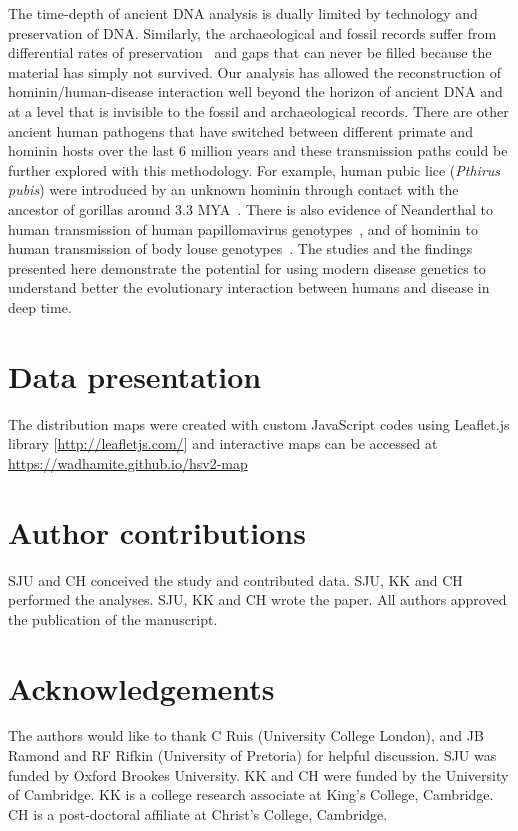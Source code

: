 \documentclass[fleqn,10pt]{wlscirep}
\begin{document}
The time-depth of ancient DNA analysis is dually limited by technology and preservation of DNA. Similarly, the archaeological and fossil records suffer from differential rates of preservation~\citep{Allentoft2012} and gaps that can never be filled because the material has simply not survived. Our analysis has allowed the reconstruction of hominin/human-disease interaction well beyond the horizon of ancient DNA and at a level that is invisible to the fossil and archaeological records. There are other ancient human pathogens that have switched between different primate and hominin hosts over the last 6 million years and these transmission paths could be further explored with this methodology. For example, human pubic lice (\textit{Pthirus pubis}) were introduced by an unknown hominin through contact with the ancestor of gorillas around 3.3 MYA~\citep{Reed2007}. There is also evidence of Neanderthal to human transmission of human papillomavirus genotypes~\citep{Pimenoff2017}, and of hominin to human transmission of body louse genotypes~\citep{Reed2004a}. The studies and the findings presented here demonstrate the potential for using modern disease genetics to understand better the evolutionary interaction between humans and disease in deep time.

\section*{Data presentation}
The distribution maps were created with custom JavaScript codes using Leaflet.js library  [\url{http://leafletjs.com/}] and interactive maps can be accessed at \url{https://wadhamite.github.io/hsv2-map}

\section*{Author contributions}
SJU and CH conceived the study and contributed data. SJU, KK and CH performed the analyses. SJU, KK and CH wrote the paper. All authors approved the publication of the manuscript.

\section*{Acknowledgements}
The authors would like to thank C Ruis (University College London), and JB Ramond and RF Rifkin (University of Pretoria) for helpful discussion. SJU was funded by Oxford Brookes University. KK and CH were funded by the University of Cambridge. KK is a college research associate at King’s College, Cambridge. CH is a post-doctoral affiliate at Christ’s College, Cambridge.
\end{document}
